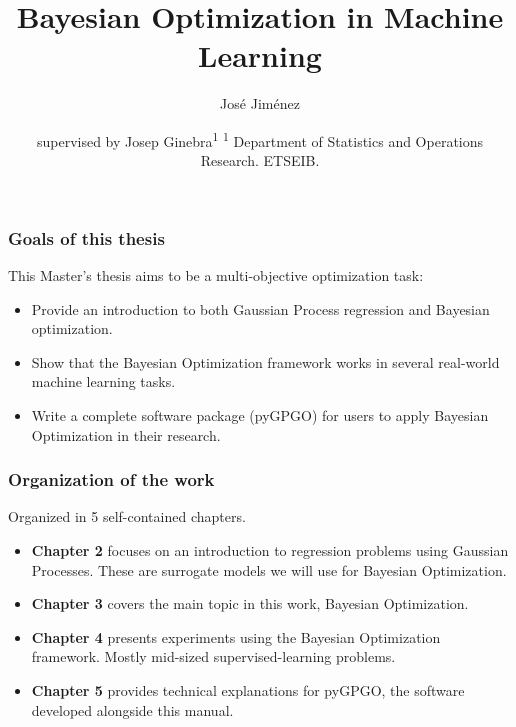 \documentclass[10pt]{beamer}
\author{José Jiménez}
\title{Bayesian Optimization in Machine Learning}
\institute{Master's Thesis \vfill Master's degree in Statistics and Operations Research}
\date{\tiny supervised by Josep Ginebra\textsuperscript{1}\vfill
	\textsuperscript{1} Department of Statistics and Operations Research. ETSEIB.}
\begin{document}
	\maketitle
	
	\begin{frame}
		\frametitle{Goals of this thesis}
		This Master's thesis aims to be a multi-objective optimization task:
		
		\begin{itemize}
			\item Provide an introduction to both Gaussian Process regression and Bayesian optimization. 
			\item Show that the Bayesian Optimization framework works in several real-world machine learning tasks.
			\item Write a complete software package (pyGPGO) for users to apply Bayesian Optimization in their research.
		\end{itemize}
	\end{frame}
	
	\begin{frame}
		\frametitle{Organization of the work}
		Organized in 5 self-contained chapters.
		\begin{itemize}
			\item \textbf{Chapter 2} focuses on an introduction to regression problems using Gaussian Processes. These are surrogate models we will use for Bayesian Optimization.
			\item \textbf{Chapter 3} covers the main topic in this work, Bayesian Optimization.
			\item \textbf{Chapter 4} presents experiments using the Bayesian Optimization framework. Mostly mid-sized supervised-learning problems.
			\item \textbf{Chapter 5} provides technical explanations for pyGPGO, the software developed alongside this manual.
		\end{itemize}
	\end{frame}
	
\end{document}
